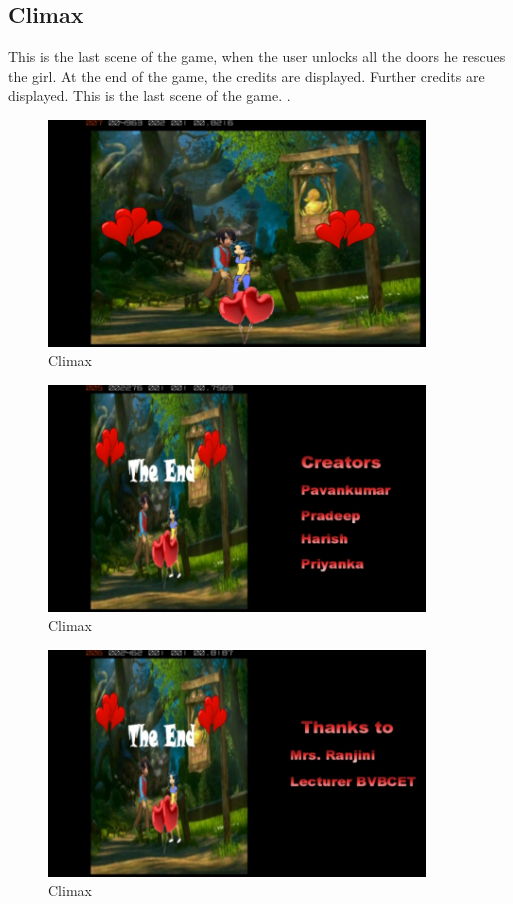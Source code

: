 \subsection{Climax}
\hspace{1cm}This is the last scene of the game, when the user unlocks all the doors he rescues the girl.
At the end of the game, the credits are displayed.
Further credits are displayed. This is the last scene of the game.
 \cite{DBLP:journals/ivc/KadyrovP03}.\\

\begin{figure}[htbp]
	\centering
	\includegraphics[width=10cm,height=6cm]{15.jpg}
	\caption{Climax}
\end{figure}
\begin{figure}[htbp]
	\centering
	\includegraphics[width=10cm,height=6cm]{16.jpg}
	\caption{Climax}
\end{figure}
\begin{figure}[htbp]
	\centering
	\includegraphics[width=10cm,height=6cm]{17.jpg}
	\caption{Climax}
\end{figure}

